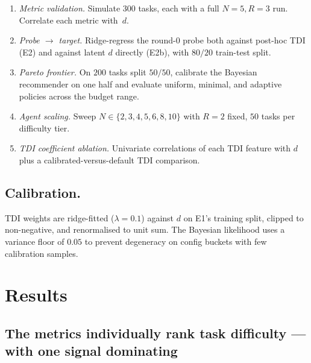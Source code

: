 \documentclass[10pt,a4paper]{article}
\begin{document}
\begin{enumerate}[label=E\arabic*.,leftmargin=*,topsep=2pt,itemsep=1pt]
  \item \emph{Metric validation.} Simulate $300$ tasks, each with a full
        $N{=}5, R{=}3$ run. Correlate each metric with~$d$.
  \item \emph{Probe $\to$ target.} Ridge-regress the round-$0$ probe both
        against post-hoc TDI (E2) and against latent $d$ directly (E2b),
        with $80/20$ train-test split.
  \item \emph{Pareto frontier.} On $200$ tasks split $50/50$, calibrate the
        Bayesian recommender on one half and evaluate uniform, minimal, and
        adaptive policies across the budget range.
  \item \emph{Agent scaling.} Sweep $N\!\in\!\{2,3,4,5,6,8,10\}$ with
        $R{=}2$ fixed, $50$ tasks per difficulty tier.
  \item \emph{TDI coefficient ablation.} Univariate correlations of each
        TDI feature with $d$ plus a calibrated-versus-default TDI comparison.
\end{enumerate}

\subsection{Calibration.} TDI weights are ridge-fitted ($\lambda\!=\!0.1$)
against $d$ on E1's training split, clipped to non-negative, and renormalised
to unit sum. The Bayesian likelihood uses a variance floor of $0.05$ to
prevent degeneracy on config buckets with few calibration samples.

\section{Results}\label{sec:results}

\subsection{The metrics individually rank task difficulty --- with one signal dominating}


\label{tab:corr}
\vspace{4pt}
\end{document}
